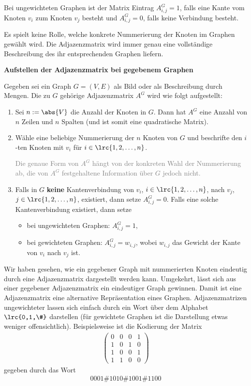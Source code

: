 Bei ungewichteten Graphen ist der Matrix Eintrag $A^G_{i,j} = 1$, falls eine Kante vom Knoten $v_i$ zum Knoten $v_j$ besteht und $A^G_{i,j} = 0$, falls keine Verbindung besteht.

Es spielt keine Rolle, welche konkrete Nummerierung der Knoten im Graphen gewählt wird. Die Adjazenzmatrix wird immer genau eine vollständige Beschreibung des ihr entsprechenden Graphen liefern.

\begin{myprocedure}\label{vorgehen_adjazenz}
	\textbf{Aufstellen der Adjazenzmatrix bei gegebenem Graphen}

	Gegeben sei ein Graph $G = (V,E)$ als Bild oder als Beschreibung durch Mengen. Die zu $G$ gehörige Adjazenzmatrix $A^G$ wird wie folgt aufgestellt:
	\begin{enumerate}
		\item Sei $n:= \abs{V}$ die Anzahl der Knoten in $G$. Dann hat $A^G$ eine Anzahl von $n$ Zeilen und $n$ Spalten (und ist somit eine quadratische Matrix).
		\item Wähle eine beliebige Nummerierung der $n$ Knoten von $G$ und beschrifte den $i$-ten Knoten mit $v_i$ für $i\in\lrc{1,2,\ldots ,n}$.

		      \textcolor{Gray}{Die genaue Form von $A^G$ hängt von der konkreten Wahl der Nummerierung ab, die von $A^G$ festgehaltene Information über $G$ jedoch nicht.}
		\item Falls in $G$ \textbf{keine} Kantenverbindung von $v_i$, $i\in\lrc{1,2,\ldots ,n}$,  nach $v_j$, $j\in\lrc{1,2,\ldots ,n}$, existiert, dann setze $A^G_{i,j} = 0$. Falls eine solche Kantenverbindung existiert, dann setze
		      \begin{itemize}
			      \item bei ungewichteten Graphen: $A^G_{i,j} = 1$,
			      \item bei gewichteten Graphen: $A^G_{i,j} = w_{i,j}$, wobei $w_{i,j}$ das Gewicht der Kante von $v_i$ nach $v_j$ ist.
		      \end{itemize}
	\end{enumerate}
\end{myprocedure}

Wir haben gesehen, wie ein gegebener Graph mit nummerierten Knoten eindeutig durch eine Adjazenzmatrix dargestellt werden kann. Umgekehrt, lässt sich aus einer gegebener Adjazenzmatrix ein eindeutiger Graph gewinnen. Damit ist eine Adjazenzmatrix eine alternative Repräsentation eines Graphen. Adjazenzmatrizen ungewichteter lassen sich einfach durch ein Wort über dem Alphabet $\lrc{0,1,\#}$ darstellen (für gewichtete Graphen ist die Darstellung etwas weniger offensichtlich). Beispielsweise ist die Kodierung der Matrix
\begin{align*}
	\left( \begin{matrix} 0 & 0 & 0 & 1 \\ 1 & 0 & 1 & 0 \\ 1 & 0 & 0 & 1 \\ 1 & 1 & 0 & 0 \end{matrix} \right)
\end{align*}
gegeben durch das Wort
\begin{align*}
	0001\#1010\#1001\#1100
\end{align*}

